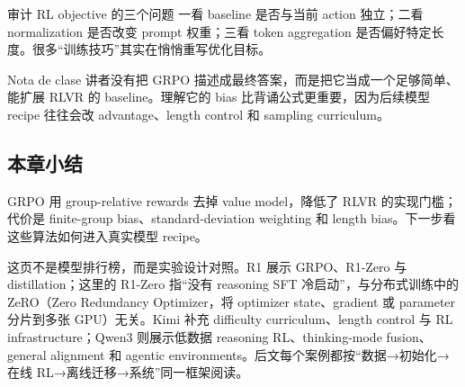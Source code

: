\begin{importantbox}{审计 RL objective 的三个问题}
一看 baseline 是否与当前 action 独立；二看 normalization 是否改变 prompt 权重；三看 token aggregation 是否偏好特定长度。很多“训练技巧”其实在悄悄重写优化目标。
\end{importantbox}

\begin{knowledgebox}{Nota de clase}
讲者没有把 GRPO 描述成最终答案，而是把它当成一个足够简单、能扩展 RLVR 的 baseline。理解它的 bias 比背诵公式更重要，因为后续模型 recipe 往往会改 advantage、length control 和 sampling curriculum。
\end{knowledgebox}

\subsection{本章小结}

GRPO 用 group-relative rewards 去掉 value model，降低了 RLVR 的实现门槛；代价是 finite-group bias、standard-deviation weighting 和 length bias。下一步看这些算法如何进入真实模型 recipe。


这页不是模型排行榜，而是实验设计对照。R1 展示 GRPO、R1-Zero 与 distillation；这里的 R1-Zero 指“没有 reasoning SFT 冷启动”，与分布式训练中的 ZeRO（Zero Redundancy Optimizer，将 optimizer state、gradient 或 parameter 分片到多张 GPU）无关。Kimi 补充 difficulty curriculum、length control 与 RL infrastructure；Qwen3 则展示低数据 reasoning RL、thinking-mode fusion、general alignment 和 agentic environments。后文每个案例都按“数据→初始化→在线 RL→离线迁移→系统”同一框架阅读。

